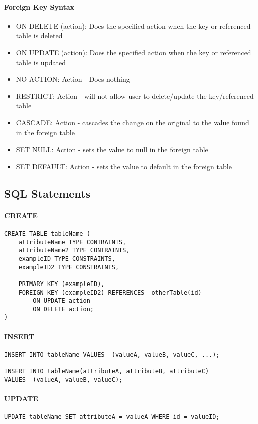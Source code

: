\paragraph{Foreign Key Syntax}
\begin{itemize}
	\item ON DELETE (action): Does the specified action when the key or referenced table is deleted
	\item ON UPDATE (action): Does the specified action when the key or referenced table is updated
	\item NO ACTION: Action - Does nothing
	\item RESTRICT: Action - will not allow user to delete/update the key/referenced table
	\item CASCADE: Action - cascades the change on the original to the value found in the foreign table
	\item SET NULL: Action - sets the value to null in the foreign table
	\item SET DEFAULT: Action - sets the value to default in the foreign table
\end{itemize}

\subsection{SQL Statements}
\paragraph{CREATE}
\begin{verbatim}
CREATE TABLE tableName (
    attributeName TYPE CONTRAINTS,
    attributeName2 TYPE CONTRAINTS,
    exampleID TYPE CONSTRAINTS,
    exampleID2 TYPE CONSTRAINTS,

    PRIMARY KEY (exampleID),
    FOREIGN KEY (exampleID2) REFERENCES  otherTable(id)
        ON UPDATE action
        ON DELETE action;
)
\end{verbatim}

\paragraph{INSERT}
\begin{verbatim}
INSERT INTO tableName VALUES  (valueA, valueB, valueC, ...);

INSERT INTO tableName(attributeA, attributeB, attributeC) 
VALUES  (valueA, valueB, valueC);
\end{verbatim}

\paragraph{UPDATE}
\begin{verbatim}
UPDATE tableName SET attributeA = valueA WHERE id = valueID;
\end{verbatim}

